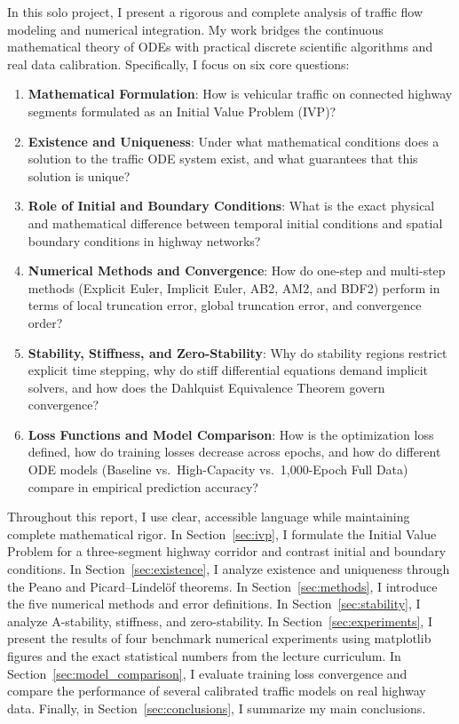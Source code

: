 \documentclass[runningheads]{llncs}
\begin{document}
In this solo project, I present a rigorous and complete analysis of traffic flow modeling and numerical integration. My work bridges the continuous mathematical theory of ODEs with practical discrete scientific algorithms and real data calibration. Specifically, I focus on six core questions:
\begin{enumerate}
    \item \textbf{Mathematical Formulation}: How is vehicular traffic on connected highway segments formulated as an Initial Value Problem (IVP)?
    \item \textbf{Existence and Uniqueness}: Under what mathematical conditions does a solution to the traffic ODE system exist, and what guarantees that this solution is unique?
    \item \textbf{Role of Initial and Boundary Conditions}: What is the exact physical and mathematical difference between temporal initial conditions and spatial boundary conditions in highway networks?
    \item \textbf{Numerical Methods and Convergence}: How do one-step and multi-step methods (Explicit Euler, Implicit Euler, AB2, AM2, and BDF2) perform in terms of local truncation error, global truncation error, and convergence order?
    \item \textbf{Stability, Stiffness, and Zero-Stability}: Why do stability regions restrict explicit time stepping, why do stiff differential equations demand implicit solvers, and how does the Dahlquist Equivalence Theorem govern convergence?
    \item \textbf{Loss Functions and Model Comparison}: How is the optimization loss defined, how do training losses decrease across epochs, and how do different ODE models (Baseline vs.\ High-Capacity vs.\ 1,000-Epoch Full Data) compare in empirical prediction accuracy?
\end{enumerate}

Throughout this report, I use clear, accessible language while maintaining complete mathematical rigor. In Section~\ref{sec:ivp}, I formulate the Initial Value Problem for a three-segment highway corridor and contrast initial and boundary conditions. In Section~\ref{sec:existence}, I analyze existence and uniqueness through the Peano and Picard--Lindel\"of theorems. In Section~\ref{sec:methods}, I introduce the five numerical methods and error definitions. In Section~\ref{sec:stability}, I analyze A-stability, stiffness, and zero-stability. In Section~\ref{sec:experiments}, I present the results of four benchmark numerical experiments using matplotlib figures and the exact statistical numbers from the lecture curriculum. In Section~\ref{sec:model_comparison}, I evaluate training loss convergence and compare the performance of several calibrated traffic models on real highway data. Finally, in Section~\ref{sec:conclusions}, I summarize my main conclusions.
\end{document}
